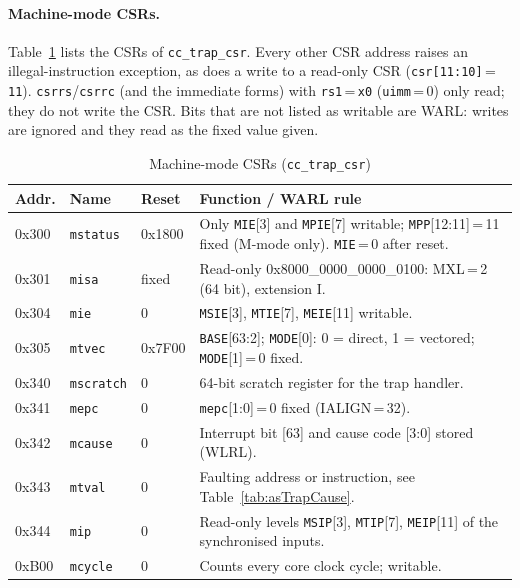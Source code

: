 \paragraph{Machine-mode CSRs.}
Table~\ref{tab:asTrapCsr} lists the CSRs of \texttt{cc\_trap\_csr}. Every
other CSR address raises an illegal-instruction exception, as does a write
to a read-only CSR (\texttt{csr[11:10]}\,=\,\texttt{11}).
\texttt{csrrs}/\texttt{csrrc} (and the immediate forms) with
\texttt{rs1}\,=\,\texttt{x0} (\texttt{uimm}\,=\,0) only read; they do not
write the CSR. Bits that are not listed as writable are WARL: writes are
ignored and they read as the fixed value given.

\begin{table}[htbp]
\caption{Machine-mode CSRs (\texttt{cc\_trap\_csr})}
\label{tab:asTrapCsr}
\centering
{\footnotesize
\begin{tabularx}{\textwidth}{|p{1.6cm} |p{2.1cm} |p{1.5cm} |X |}
  \hline
  Addr. & Name & Reset & Function / WARL rule \\
  \hline
  \hline
  0x300 & \texttt{mstatus}   & 0x1800 & Only \texttt{MIE}[3] and \texttt{MPIE}[7] writable;
    \texttt{MPP}[12:11]\,=\,11 fixed (M-mode only). \texttt{MIE}\,=\,0 after reset. \\
  \hline
  0x301 & \texttt{misa}      & fixed & Read-only 0x8000\_0000\_0000\_0100: MXL\,=\,2 (64 bit), extension I. \\
  \hline
  0x304 & \texttt{mie}       & 0 & \texttt{MSIE}[3], \texttt{MTIE}[7], \texttt{MEIE}[11] writable. \\
  \hline
  0x305 & \texttt{mtvec}     & 0x7F00 & \texttt{BASE}[63:2]; \texttt{MODE}[0]: 0 = direct,
    1 = vectored; \texttt{MODE}[1]\,=\,0 fixed. \\
  \hline
  0x340 & \texttt{mscratch}  & 0 & 64-bit scratch register for the trap handler. \\
  \hline
  0x341 & \texttt{mepc}      & 0 & \texttt{mepc}[1:0]\,=\,0 fixed (IALIGN\,=\,32). \\
  \hline
  0x342 & \texttt{mcause}    & 0 & Interrupt bit [63] and cause code [3:0] stored (WLRL). \\
  \hline
  0x343 & \texttt{mtval}     & 0 & Faulting address or instruction, see Table~\ref{tab:asTrapCause}. \\
  \hline
  0x344 & \texttt{mip}       & 0 & Read-only levels \texttt{MSIP}[3], \texttt{MTIP}[7],
    \texttt{MEIP}[11] of the synchronised inputs. \\
  \hline
  0xB00 & \texttt{mcycle}    & 0 & Counts every core clock cycle; writable. \\

\end{tabularx}}
\end{table}
